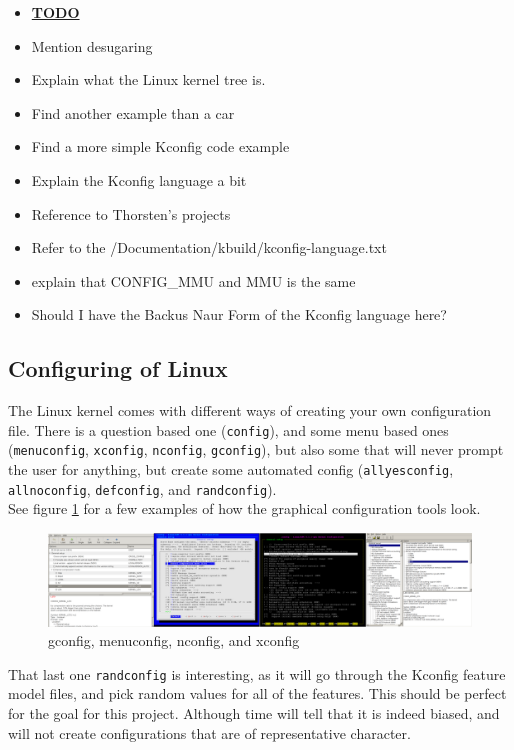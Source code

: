 \documentclass[a4paper,11pt]{report}
\newcommand{\figa}{
    \begin{figure}[!htpb]
    \centering
}
\newcommand{\figb}[2]{
    \caption{#1}
    \label{#2}
    \end{figure}
}
\begin{document}
\begin{itemize}
    \item \underline{\textbf{TODO}}
    \item Mention desugaring
    \item Explain what the Linux kernel tree is.
    \item Find another example than a car
    \item Find a more simple Kconfig code example
    \item Explain the Kconfig language a bit
    \item Reference to Thorsten's projects
    \item Refer to the /Documentation/kbuild/kconfig-language.txt
    \item explain that CONFIG\_MMU and MMU is the same
    \item Should I have the Backus Naur Form of the Kconfig language here?
\end{itemize}

\subsection{Configuring of Linux}

The Linux kernel comes with different ways of creating your own configuration 
file. There is a question based one (\texttt{config}), and some menu based ones 
(\texttt{menuconfig}, \texttt{xconfig}, \texttt{nconfig}, \texttt{gconfig}), 
but also some that will never prompt the user for anything, but create some 
automated config (\texttt{allyesconfig}, \texttt{allnoconfig}, 
\texttt{defconfig}, and \texttt{randconfig}).
\\

See figure \ref{fig:lineofconfigs} for a few examples of how the graphical 
configuration tools look.
\\


\figa
    \includegraphics[scale=0.25]{pngs/configs50percent.png}
\figb{gconfig, menuconfig, nconfig, and xconfig}{fig:lineofconfigs}

That last one \texttt{randconfig} is interesting, as it will go through the 
Kconfig feature model files, and pick random values for all of the features. 
This should be perfect for the goal for this project. Although time will tell 
that it is indeed biased, and will not create configurations that are of 
representative character. 
\end{document}
